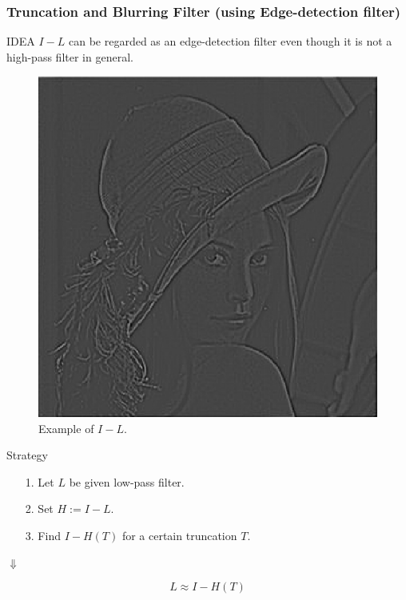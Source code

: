\documentclass{beamer}
\begin{document}
\begin{frame}
\frametitle{Truncation and Blurring Filter (using Edge-detection filter)}

\begin{beamerboxesrounded}[lower=eeks2,upper=eecks,
shadow=true]{IDEA}
$I-L$ can be regarded as an edge-detection filter even though it is not a high-pass filter in general.
\end{beamerboxesrounded}

\begin{figure}
\includegraphics[width=0.9\linewidth]{I-LPF.png} 
\caption*{Example of $I-L$.}
\end{figure}

\bigskip

\pause

Strategy

\begin{itemize}
\item[1.] Let $L$ be given low-pass filter.
\item[2.] Set $H:=I-L$. 
\item[3.] Find $I-H(T)$ for a certain truncation $T$.
\end{itemize}
\pause
\begin{center}
$\Downarrow$
\end{center}

\pause
$$L\approx I-H(T)$$
\end{frame}
\end{document}
